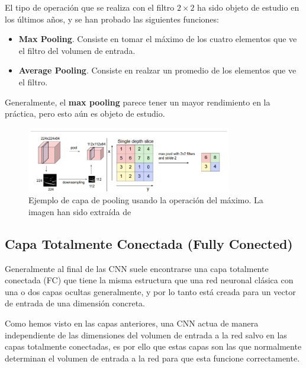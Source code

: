             \medskip

            \noindent El tipo de operación que se realiza con el filtro $2 \times 2$ ha sido objeto de estudio en los últimos años, y se han probado las siguientes funciones: 

            \begin{itemize}
                \item \textbf{Max Pooling}. Consiste en tomar el máximo de los cuatro elementos que ve el filtro del volumen de entrada. 
                \item \textbf{Average Pooling}. Consiste en realzar un promedio de los elementos que ve el filtro.
            \end{itemize}

            \noindent Generalmente, el \textbf{max pooling} parece tener un mayor rendimiento en la práctica, pero esto aún es objeto de estudio.

            \begin{figure}[!h]
                \centering
                \includegraphics[width=0.8\textwidth]{img/pooling.png}
                \caption{Ejemplo de capa de pooling usando la operación del máximo. La imagen han sido extraída de \cite{StanfordCourse}}
                \label{fig:pooling}
            \end{figure}
        
        \subsection{Capa Totalmente Conectada (Fully Conected)}
            \noindent Generalmente al final de las CNN suele encontrarse una capa totalmente conectada (FC) que tiene la misma estructura que una red neuronal clásica con una o dos capas ocultas generalmente, y por lo tanto está creada para un vector de entrada de una dimensión concreta.

            \medskip

            \noindent Como hemos visto en las capas anteriores, una CNN actua de manera independiente de las dimensiones del volumen de entrada a la red salvo en las capas totalmente conectadas, es por ello que estas capas son las que normalmente determinan el volumen de entrada a la red para que esta funcione correctamente.

